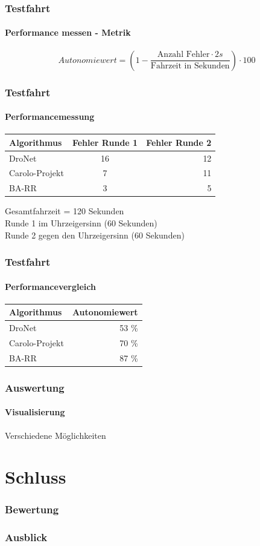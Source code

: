 \documentclass{beamer}
\begin{document}
\begin{frame}
\frametitle{Testfahrt}
\framesubtitle{Performance messen - Metrik}
\begin{equation}
Autonomiewert = (1 -  \frac{\text{Anzahl Fehler}\cdot 2 s}{\text{Fahrzeit in Sekunden}})\cdot 100
\end{equation}
\end{frame}

\begin{frame}
\frametitle{Testfahrt}
\framesubtitle{Performancemessung}
\begin{table}[h]
  \begin{center}
    \label{tab:testfahrten}
    \begin{tabular}{l|c|r} 
      \textbf{Algorithmus} & \textbf{Fehler Runde 1} & \textbf{Fehler Runde 2}\\
      \hline
      DroNet & 16 & 12\\
      Carolo-Projekt & 7 & 11\\
       BA-RR& 3 & 5\\
    \end{tabular}
  \end{center}
\end{table}
Gesamtfahrzeit = 120 Sekunden\\
Runde 1 im Uhrzeigersinn (60 Sekunden)\\
Runde 2 gegen den Uhrzeigersinn (60 Sekunden)

\end{frame}

\begin{frame}
\frametitle{Testfahrt}
\framesubtitle{Performancevergleich}

\begin{table}[h]
  \begin{center}
    \label{tab:autonomie}
    \begin{tabular}{l|r}
      \textbf{Algorithmus} & \textbf{Autonomiewert} \\
      \hline
      DroNet & 53 \% \\
      Carolo-Projekt & 70 \%  \\
       BA-RR& 87 \% \\
    \end{tabular}
  \end{center}
\end{table}

\end{frame}

\begin{frame}
\frametitle{Auswertung}
\framesubtitle{Visualisierung}
Verschiedene Möglichkeiten

\end{frame}

\section{Schluss}
\frame{\tableofcontents[currentsection]}

\begin{frame}
\frametitle{Bewertung}

\end{frame}

\begin{frame}
\frametitle{Ausblick}

\end{frame}
\end{document}
